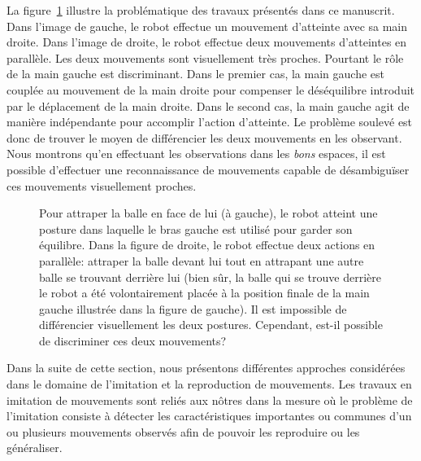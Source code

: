 La figure~\ref{fig:spotDiff} illustre la problématique des travaux présentés dans ce manuscrit.
Dans l'image de gauche, le robot effectue un mouvement d'atteinte avec sa main droite.
Dans l'image de droite, le robot effectue deux mouvements d'atteintes en parallèle.
Les deux mouvements sont visuellement très proches. Pourtant le rôle
de la main gauche est discriminant. Dans le premier cas, la main gauche 
est couplée au mouvement de la main droite pour compenser
le déséquilibre introduit par le déplacement de la main droite.
Dans le second cas, la main gauche agit de manière indépendante pour accomplir l'action
d'atteinte. Le problème soulevé est donc de trouver le moyen
de différencier les deux mouvements en les observant. Nous montrons
qu'en effectuant les observations dans les \emph{bons} espaces,
il est possible d'effectuer une reconnaissance 
de mouvements capable de désambiguïser ces mouvements visuellement proches.
\begin{figure}
  \centering
  \caption[Comment désambiguïser des mouvements proches?]{Pour attraper la balle en face de lui (\`a gauche), le robot
  atteint une posture dans laquelle le bras gauche est utilisé pour garder son équilibre. 
  Dans la figure de droite, le robot effectue deux actions en parallèle:
  attraper la balle devant lui tout en attrapant une autre balle se trouvant derrière lui 
  (bien sûr, la balle qui se trouve derrière le robot a été volontairement placée à la position 
  finale de la main gauche illustrée dans la figure de gauche). Il est 
  impossible de différencier visuellement les deux postures. Cependant,
  est-il possible de discriminer ces deux mouvements?}
  \label{fig:spotDiff}
\end{figure}

Dans la suite de cette section, nous présentons différentes
approches considérées dans le domaine de l'imitation et la reproduction
de mouvements. Les travaux en imitation de mouvements sont 
reliés aux nôtres dans la mesure où le problème de l'imitation 
consiste à détecter les caractéristiques importantes ou communes d'un ou
plusieurs mouvements observés afin de pouvoir les reproduire ou les généraliser.

